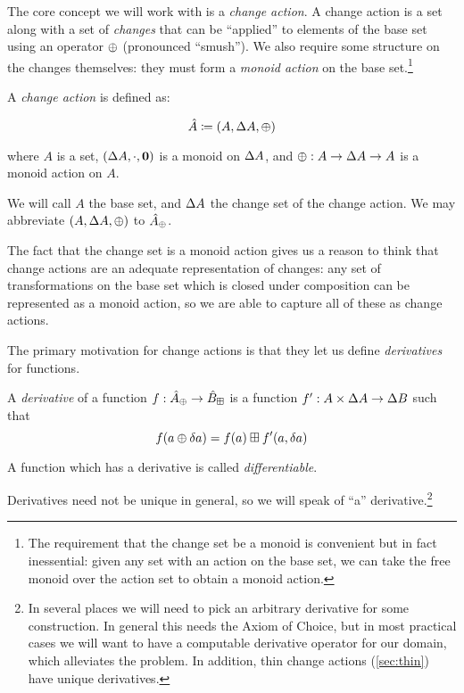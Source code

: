 The core concept we will work with is a \emph{change action}. A change action is
a set along with a set of \emph{changes} that can be ``applied'' to elements of
the base set using an operator $\oplus$ (pronounced ``smush''). We also require
some structure on the changes themselves: they must form a \emph{monoid action}
on the base set.\footnote{The requirement that the change set be a monoid is convenient but in
  fact inessential: given any set with an action on the base set, we can take the
  free monoid over the action set to obtain a monoid action.}

\begin{defn}
  A \emph{change action} is defined as:

  \begin{displaymath}
    \hat{A} \coloneqq (A,\Delta A,\oplus)
  \end{displaymath}

  where $A$ is a set, $(\Delta A, \cdot, \textbf{0})$ is a monoid on $\Delta A$, and $\oplus : A \rightarrow
  \Delta A \rightarrow A$ is a monoid action on $A$.

  We will call $A$ the base set, and $\Delta A$ the change set of the change
  action. We may abbreviate $(A,\Delta A,\oplus)$ to $\hat{A}_\oplus$.
\end{defn}

The fact that the change set is a monoid action gives us a reason to think that
change actions are an adequate representation of changes: any set of
transformations on the base set which is closed under composition can be
represented as a monoid action, so we are able to capture all of these as change actions.

The primary motivation for change actions is that they let us define
\emph{derivatives} for functions.

\begin{defn}[Derivatives]
  A \emph{derivative} of a function $f: \hat{A}_\oplus \rightarrow \hat{B}_\boxplus$ is a function $f': A \times \Delta A \rightarrow
  \Delta B$ such that
  \begin{displaymath}
    f(a \oplus \delta a) = f(a) \boxplus f'(a, \delta a)
  \end{displaymath}

  A function which has a derivative is called \emph{differentiable}.
\end{defn}

Derivatives need not be unique in general, so we will speak of ``a''
derivative.\footnote{In several places we will need to pick an arbitrary
  derivative for some construction. In general this needs the Axiom of Choice,
  but in most practical cases we will want to have a computable derivative
  operator for our domain, which alleviates the problem. In addition, thin
  change actions (\cref{sec:thin}) have unique derivatives.}

